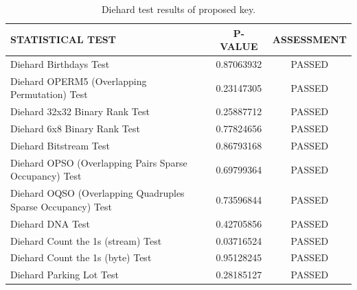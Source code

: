 \begin{table}[H]
	\small
	\caption{Diehard test results of proposed key.}
	\label{table:diehard}
	\begin{center}
		\begin{tabular}{|l |c |c |}
			\hline
			STATISTICAL TEST                                            &
			P-VALUE                                                     &
			ASSESSMENT                                                                        \\ [0.005ex]
			\hline
			Diehard Birthdays Test                                      &
			0.87063932                                                  & PASSED
			\\[0.005ex]
			Diehard OPERM5 (Overlapping Permutation) Test               &
			0.23147305                                                  & PASSED
			\\[0.005ex]
			Diehard 32x32 Binary Rank Test                              &
			0.25887712                                                  & PASSED
			\\[0.005ex]
			Diehard 6x8 Binary Rank Test                                &
			0.77824656                                                  & PASSED
			\\[0.005ex]
			Diehard Bitstream Test                                      &
			0.86793168                                                  & PASSED
			\\[0.005ex]
			Diehard OPSO (Overlapping Pairs Sparse Occupancy) Test      &
			0.69799364                                                  & PASSED
			\\[0.005ex]
			Diehard OQSO (Overlapping Quadruples Sparse Occupancy) Test &
			0.73596844                                                  & PASSED
			\\[0.005ex]
			Diehard DNA Test                                            &
			0.42705856                                                  & PASSED
			\\[0.005ex]
			Diehard Count the 1s (stream) Test                          &
			0.03716524                                                  & PASSED
			\\[0.005ex]
			Diehard Count the 1s (byte) Test                            &
			0.95128245                                                  & PASSED
			\\[0.005ex]
			Diehard Parking Lot Test                                    &
			0.28185127                                                  & PASSED

\end{tabular}
\end{center}
\end{table}
